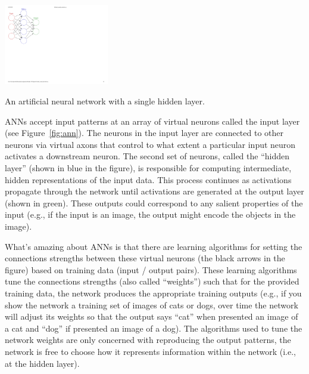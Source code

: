 \documentclass[assignment01_Solutions]{subfiles}
\begin{document}
\begin{marginfigure}
\includegraphics[width=1.8in]{figures/Colored_neural_network}
\caption{An artificial neural network with a single hidden layer.}\label{fig:ann}
\end{marginfigure}
ANNs accept input patterns at an array of virtual neurons called the input layer (see Figure~\ref{fig:ann}).  The neurons in the input layer are connected to other neurons via virtual axons that control to what extent a particular input neuron activates a downstream neuron.  The second set of neurons, called the ``hidden layer'' (shown in blue in the figure), is responsible for computing intermediate, hidden representations of the input data.  This process continues as activations propagate through the network until activations are generated at the output layer (shown in green). These outputs could correspond to any salient properties of the input (e.g., if the input is an image, the output might encode the objects in the image).

What's amazing about ANNs is that there are learning algorithms for setting the connections strengths between these virtual neurons (the black arrows in the figure) based on training data (input / output pairs).  These learning algorithms tune the connections strengths (also called ``weights'') such that for the provided training data, the network produces the appropriate training outputs (e.g., if you show the network a training set of images of cats or dogs, over time the network will adjust its weights so that the output says ``cat'' when presented an image of a cat and ``dog'' if presented an image of a dog).  The algorithms used to tune the network weights are only concerned with reproducing the output patterns, the network is free to choose how it represents information within the network (i.e., at the hidden layer).
\end{document}
